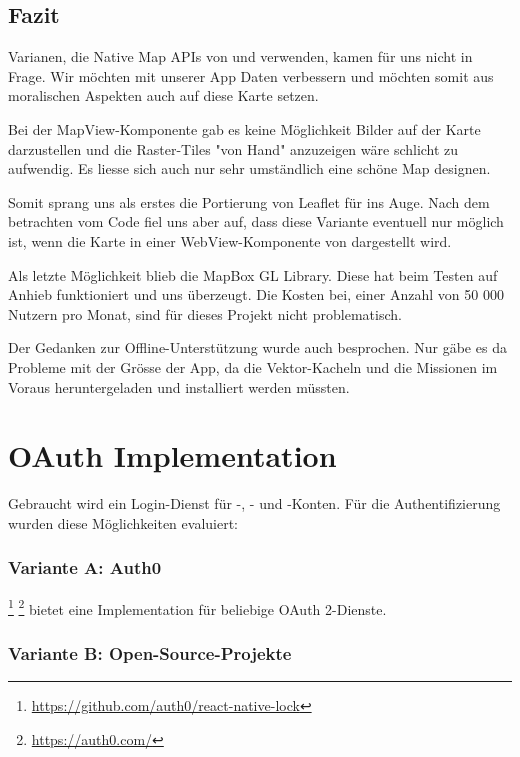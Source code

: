 \subsection{Fazit}

Varianen, die Native Map APIs von  und  verwenden, kamen für uns nicht in Frage.
Wir möchten mit unserer App  Daten verbessern und möchten somit aus moralischen Aspekten auch auf diese Karte setzen. 

Bei der  MapView-Komponente gab es keine Möglichkeit Bilder auf der Karte darzustellen und die Raster-Tiles "von Hand" anzuzeigen wäre schlicht zu aufwendig. 
Es liesse sich auch nur sehr umständlich eine schöne Map designen.

Somit sprang uns als erstes die Portierung von Leaflet für  ins Auge. 
Nach dem betrachten vom Code fiel uns aber auf, dass diese Variante eventuell nur möglich ist, wenn die Karte in einer WebView-Komponente von  dargestellt wird.

Als letzte Möglichkeit blieb die MapBox GL Library.
Diese hat beim Testen auf Anhieb funktioniert und uns überzeugt.
Die Kosten bei, einer Anzahl von 50 000 Nutzern pro Monat, sind für dieses Projekt nicht problematisch. 

Der Gedanken zur Offline-Unterstützung wurde auch besprochen.
Nur gäbe es da Probleme mit der Grösse der App, da die Vektor-Kacheln und die Missionen im Voraus heruntergeladen und installiert werden müssten.

\section{OAuth Implementation}
Gebraucht wird ein Login-Dienst für -, - und -Konten. 
Für die Authentifizierung wurden diese Möglichkeiten evaluiert:

\subsubsection{Variante A: Auth0}

\footnote{\url{https://github.com/auth0/react-native-lock}} \footnote{\url{https://auth0.com/}} bietet eine Implementation für beliebige \gls{OAuth} 2-Dienste. 

\subsubsection{Variante B: Open-Source-Projekte}

